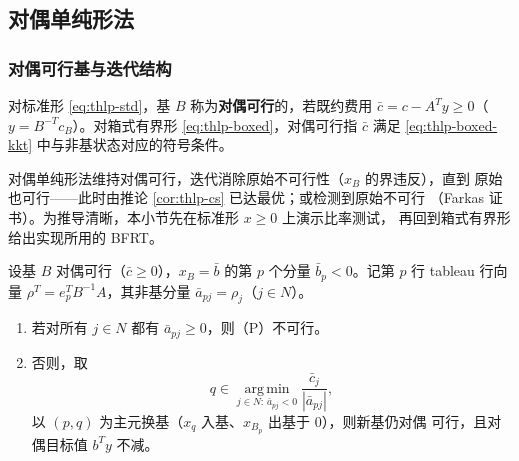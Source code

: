\subsection{对偶单纯形法}\label{subsec:thlp-dual-simplex}

\subsubsection{对偶可行基与迭代结构}

\begin{definition}[对偶可行基]\label{def:thlp-dualfeas}
对标准形 \eqref{eq:thlp-std}，基 $B$ 称为\textbf{对偶可行}的，若既约费用
$\bar c=c-A^{T}y\ge0$（$y=B^{-T}c_B$）。对箱式有界形
\eqref{eq:thlp-boxed}，对偶可行指 $\bar c$ 满足 \eqref{eq:thlp-boxed-kkt}
中与非基状态对应的符号条件。
\end{definition}

对偶单纯形法维持对偶可行，迭代消除原始不可行性（$x_B$ 的界违反），直到
原始也可行——此时由推论 \ref{cor:thlp-cs} 已达最优；或检测到原始不可行
（Farkas 证书）。为推导清晰，本小节先在标准形 $x\ge0$ 上演示比率测试，
再回到箱式有界形给出实现所用的 BFRT。

\begin{proposition}[对偶单纯形比率测试的正确性]\label{prop:thlp-bfrt-std}
设基 $B$ 对偶可行（$\bar c\ge0$），$x_B=\bar b$ 的第 $p$ 个分量
$\bar b_p<0$。记第 $p$ 行 tableau 行向量
$\rho^{T}=e_p^{T}B^{-1}A$，其非基分量 $\bar a_{pj}=\rho_j$（$j\in N$）。
\begin{enumerate}
  \item 若对所有 $j\in N$ 都有 $\bar a_{pj}\ge0$，则（P）不可行。
  \item 否则，取
  \begin{equation}\label{eq:thlp-bfrt-std}
    q\in\operatorname*{arg\,min}_{j\in N:\,\bar a_{pj}<0}
    \frac{\bar c_j}{|\bar a_{pj}|},
  \end{equation}
  以 $(p,q)$ 为主元换基（$x_q$ 入基、$x_{B_p}$ 出基于 $0$），则新基仍对偶
  可行，且对偶目标值 $b^{T}y$ 不减。
\end{enumerate}
\end{proposition}

